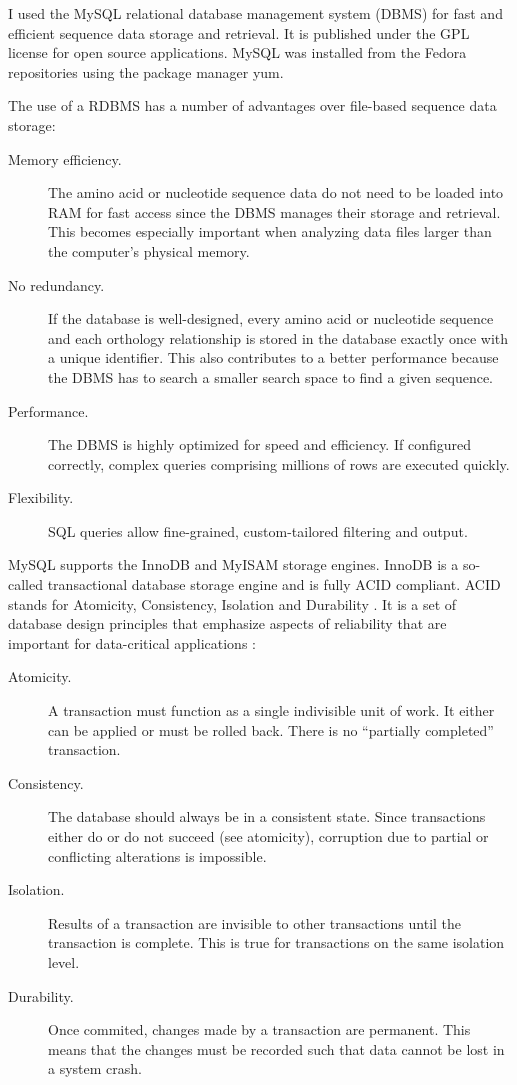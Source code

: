 \label{sec:mysql}
I used the MySQL relational database management system (DBMS) 
for fast and efficient sequence data storage and retrieval. It is published
under the GPL license for open source applications. MySQL was installed from the
Fedora repositories using the package manager yum.

The use of a RDBMS has a number of advantages over file-based sequence
data storage:

\begin{description}
	\item[Memory efficiency.] The amino acid or nucleotide sequence data do not
		need to be loaded into RAM for fast access since the DBMS manages their
		storage and retrieval.  This becomes especially important when analyzing data
		files larger than the computer's physical memory.
	\item[No redundancy.] If the database is well-designed, every amino acid or
		nucleotide sequence and each orthology relationship is stored in the database
		exactly once with a unique identifier. This also contributes to a better
		performance because the DBMS has to search a smaller search space to find a
		given sequence.
	\item[Performance.] The DBMS is highly optimized for speed and efficiency. If
		configured correctly, complex queries comprising millions of rows are
		executed quickly.
	\item[Flexibility.] SQL queries allow fine-grained, custom-tailored filtering
		and output.
\end{description}

MySQL supports the InnoDB \citep{mysql2013} and MyISAM \citep{mysql2013} storage
engines. InnoDB is a so-called transactional database storage engine and is
fully ACID compliant. ACID stands for Atomicity, Consistency, Isolation and
Durability \citep{haerder1983}. It is a set of database design principles that
emphasize aspects of reliability that are important for data-critical
applications \citep{schwartz2012}:

\begin{description}
	\item[Atomicity.] A transaction must function as a single indivisible unit of
		work. It either can be applied or must be rolled back. There is no
		``partially completed'' transaction.
	\item[Consistency.] The database should always be in a consistent state. Since
		transactions either do or do not succeed (see atomicity), corruption due to
		partial or conflicting alterations is impossible.
	\item[Isolation.] Results of a transaction are invisible to other
		transactions until the transaction is complete. This is true for
		transactions on the same isolation level.
	\item[Durability.] Once commited, changes made by a transaction are permanent.
		This means that the changes must be recorded such that data cannot be lost
		in a system crash. 
\end{description}

